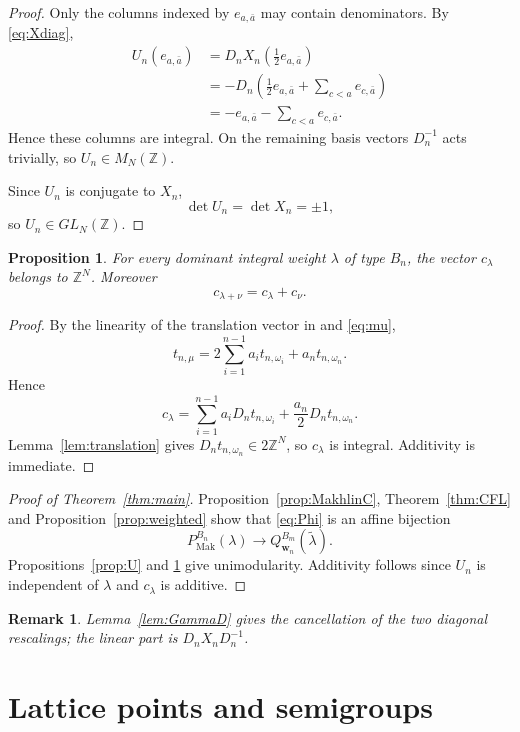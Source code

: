 \documentclass[a4paper, 12pt]{amsart}
\newtheorem{proposition}[theorem]{Proposition}
\newtheorem{remark}[theorem]{Remark}
\newcommand{\Mak}{\mathrm{Mak}}
\newcommand{\ZZ}{\mathbb Z}
\newcommand{\ww}{\mathbf w}
\begin{document}
\begin{proof}
Only the columns indexed by $e_{a,\bar a}$ may contain denominators. By \eqref{eq:Xdiag},
\[
 \begin{split}
 U_n(e_{a,\bar a})
 &=D_nX_n\left(\frac12e_{a,\bar a}\right)\\
 &=-D_n\left(\frac12e_{a,\bar a}+\sum_{c<a}e_{c,\bar a}\right)\\
 &=-e_{a,\bar a}-\sum_{c<a}e_{c,\bar a}.
 \end{split}
\]
Hence these columns are integral. On the remaining basis vectors $D_n^{-1}$ acts trivially, so $U_n\in M_N(\ZZ)$.

Since $U_n$ is conjugate to $X_n$,
\[
                 \det U_n=\det X_n=\pm1,
\]
so $U_n\in GL_N(\ZZ)$.
\end{proof}

\begin{proposition}\label{prop:c}
For every dominant integral weight $\lambda$ of type $B_n$, the vector $c_\lambda$ belongs to $\ZZ^N$. Moreover
\[
                         c_{\lambda+\nu}=c_\lambda+c_\nu.
\]
\end{proposition}

\begin{proof}
By the linearity of the translation vector in \cite{CFL24} and \eqref{eq:mu},
\[
 t_{n,\mu}=2\sum_{i=1}^{n-1}a_it_{n,\omega_i}+a_nt_{n,\omega_n}.
\]
Hence
\[
 c_\lambda=\sum_{i=1}^{n-1}a_iD_nt_{n,\omega_i}
             +\frac{a_n}{2}D_nt_{n,\omega_n}.
\]
Lemma~\ref{lem:translation} gives $D_nt_{n,\omega_n}\in2\ZZ^N$, so $c_\lambda$ is integral. Additivity is immediate.
\end{proof}

\begin{proof}[Proof of Theorem~\ref{thm:main}]
Proposition~\ref{prop:MakhlinC}, Theorem~\ref{thm:CFL} and Proposition~\ref{prop:weighted} show that \eqref{eq:Phi} is an affine bijection
\[
 P_{\Mak}^{B_n}(\lambda)
       \longrightarrow Q_{\ww_n}^{B_m}(\widetilde\lambda).
\]
Propositions~\ref{prop:U} and \ref{prop:c} give unimodularity. Additivity follows since $U_n$ is independent of $\lambda$ and $c_\lambda$ is additive.
\end{proof}

\begin{remark}\label{rem:cancellation}
Lemma~\ref{lem:GammaD} gives the cancellation of the two diagonal rescalings; the linear part is $D_nX_nD_n^{-1}$.
\end{remark}

\section{Lattice points and semigroups}\label{sec:semigroup}
\end{document}
